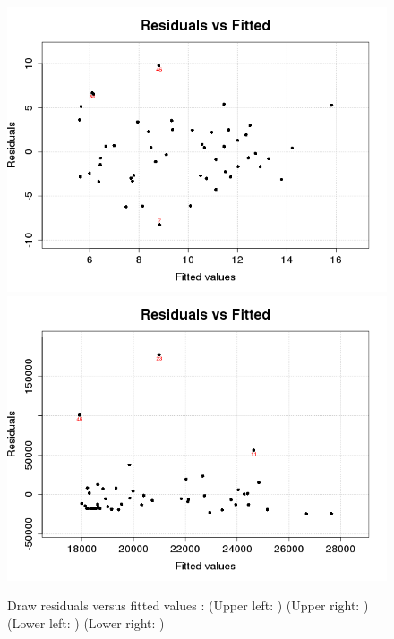 \begin{figure}[p]
\begin{center}
    \includegraphics[scale=0.4]{imgOT/model1-drawResidualsVsFitted.png}\hspace*{1cm}
	\includegraphics[scale=0.4]{imgOT/model2-drawResidualsVsFitted.png}\\
  \end{center}
  \caption{Draw residuals versus fitted values : \newline
  (Upper left: \textbf{\color{black}{model1: R output}}) (Upper right: \textbf{\color{black}{model2: R output}}) \newline
  (Lower left: \textbf{\color{blue}{model1: python output}})  (Lower right: \textbf{\color{blue}{model2: python output}}) }
\end{figure}

